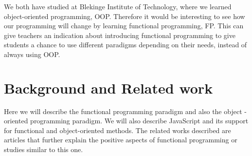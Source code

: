 \documentclass {article}
\begin{document}
We both have studied at Blekinge Institute of Technology, where we learned object-oriented programming, OOP. Therefore it would be interesting to see how our programming will change by learning functional programming, FP. This can give teachers an indication about introducing functional programming to give students a chance to use different paradigms depending on their needs, instead of always using OOP.
\section{Background and Related work}
Here we will describe the functional programming paradigm and also the object -oriented programming paradigm. We will also describe JavaScript and its support for functional and object-oriented methods. The related works described are articles that further explain the positive aspects of functional programming or studies similar to this one.
\end{document}
